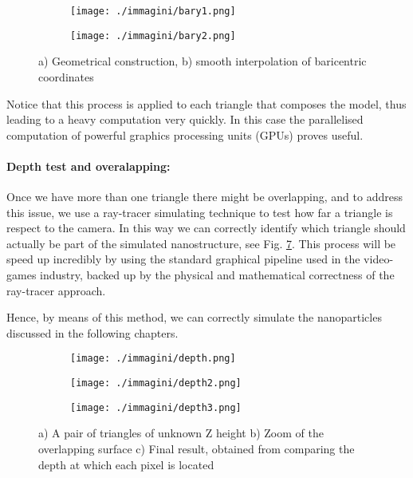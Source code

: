 \begin{figure}[ht]
    \centering
    \begin{subfigure}[b]{0.45\textwidth}
        \texttt{[image: ./immagini/bary1.png]}
        \caption{}
        \label{fig:bary_a}
    \end{subfigure}
    \hfill
    \begin{subfigure}[b]{0.45\textwidth}
        \texttt{[image: ./immagini/bary2.png]}
        \caption{}
        \label{fig:bary_b}
    \end{subfigure}
    \caption{a) Geometrical construction, b) smooth interpolation of baricentric coordinates}
    \label{fig:bary}
\end{figure}

Notice that this process is applied to each triangle that composes the model, thus leading to a heavy computation very quickly. In this case the parallelised computation of powerful graphics processing units (GPUs) proves useful.

\paragraph{Depth test and overalapping:} Once we have more than one triangle there might be overlapping, and to address this issue, we use a ray-tracer simulating technique to test how far a triangle is respect to the camera. In this way we can correctly identify which triangle should actually be part of the simulated nanostructure, see Fig. \ref{fig:depth}. This process will be speed up incredibly by using the standard graphical pipeline used in the video-games industry, backed up by the physical and mathematical correctness of the ray-tracer approach. 

\vspace{10pt}

Hence, by means of this method, we can correctly simulate the nanoparticles discussed in the following chapters.

\newpage

\begin{figure}[ht]
    \centering
    \begin{subfigure}[b]{0.32\textwidth}
        \texttt{[image: ./immagini/depth.png]}
        \caption{}
        \label{fig:depth_a}
    \end{subfigure}
    \hfill
    \begin{subfigure}[b]{0.32\textwidth}
        \texttt{[image: ./immagini/depth2.png]}
        \caption{}
        \label{fig:depth_b}
    \end{subfigure}
    \hfill
    \begin{subfigure}[b]{0.32\textwidth}
        \texttt{[image: ./immagini/depth3.png]}
        \caption{}
        \label{fig:depth_c}
    \end{subfigure}
    \caption{a) A pair of triangles of unknown Z height b) Zoom of the overlapping surface c) Final result, obtained from comparing the depth at which each pixel is located}
    \label{fig:depth}
\end{figure}

